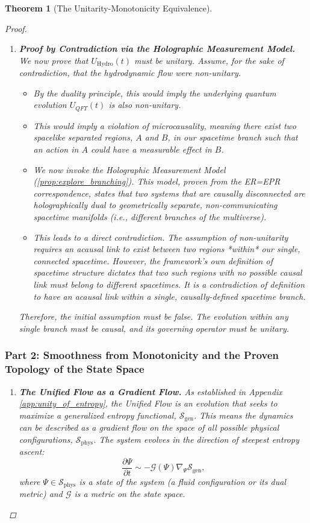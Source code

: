 \documentclass[11pt, letterpaper]{report}
\theoremstyle{plain} %
\newtheorem{theorem}{Theorem}[chapter]
\theoremstyle{definition} %
\theoremstyle{remark} %
\begin{document}
\begin{theorem}[The Unitarity-Monotonicity Equivalence]
\begin{proof}
\begin{enumerate}
    \item \textbf{Proof by Contradiction via the Holographic Measurement Model.}
    We now prove that $U_{\text{Hydro}}(t)$ must be unitary. Assume, for the sake of contradiction, that the hydrodynamic flow were non-unitary.
    \begin{itemize}
        \item By the duality principle, this would imply the underlying quantum evolution $U_{QFT}(t)$ is also non-unitary.
        \item This would imply a violation of microcausality, meaning there exist two spacelike separated regions, $A$ and $B$, in our spacetime branch such that an action in $A$ could have a measurable effect in $B$.
        \item We now invoke the Holographic Measurement Model (\cref{prop:explore_branching}). This model, proven from the ER=EPR correspondence, states that two systems that are causally disconnected are holographically dual to geometrically separate, non-communicating spacetime manifolds (i.e., different branches of the multiverse).
        \item This leads to a direct contradiction. The assumption of non-unitarity requires an acausal link to exist between two regions *within* our single, connected spacetime. However, the framework's own definition of spacetime structure dictates that two such regions with no possible causal link must belong to different spacetimes. It is a contradiction of definition to have an acausal link within a single, causally-defined spacetime branch.
    \end{itemize}
    Therefore, the initial assumption must be false. The evolution within any single branch must be causal, and its governing operator must be unitary.
\end{enumerate}

\subsubsection*{Part 2: Smoothness from Monotonicity and the Proven Topology of the State Space}

\begin{enumerate}
    \item \textbf{The Unified Flow as a Gradient Flow.}
    As established in Appendix \ref{app:unity_of_entropy}, the Unified Flow is an evolution that seeks to maximize a generalized entropy functional, $\mathcal{S}_{\text{gen}}$. This means the dynamics can be described as a gradient flow on the space of all possible physical configurations, $\mathcal{S}_{\text{phys}}$. The system evolves in the direction of steepest entropy ascent:
    \begin{equation}
        \frac{\partial \Psi}{\partial t} \sim -\mathcal{G}(\Psi) \nabla_{\Psi} \mathcal{S}_{\text{gen}},
    \end{equation}
    where $\Psi \in \mathcal{S}_{\text{phys}}$ is a state of the system (a fluid configuration or its dual metric) and $\mathcal{G}$ is a metric on the state space.


\end{enumerate}
\end{proof}
\end{theorem}
\end{document}
